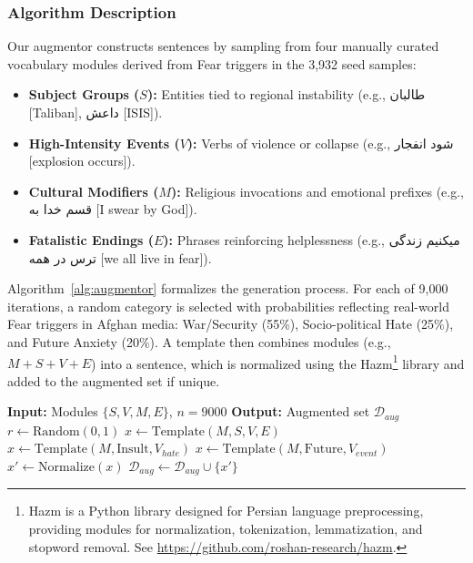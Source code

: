 \documentclass[runningheads]{llncs}
\newcommand{\textfarsi}[1]{{\foreignlanguage{arabic}{#1}}\xspace}
\begin{document}
\subsubsection{Algorithm Description}
Our augmentor constructs sentences by sampling from four manually curated 
vocabulary modules derived from Fear triggers in the 3,932 seed samples:

\begin{itemize}
    \item \textbf{Subject Groups ($S$):} Entities tied to regional instability 
    (e.g., \textfarsi{طالبان} [Taliban], \textfarsi{داعش} [ISIS]).
    \item \textbf{High-Intensity Events ($V$):} Verbs of violence or collapse 
    (e.g., \textfarsi{شود انفجار} [explosion occurs]).
    \item \textbf{Cultural Modifiers ($M$):} Religious invocations and emotional 
    prefixes (e.g., \textfarsi{قسم خدا به } [I swear by God]).
    \item \textbf{Fatalistic Endings ($E$):} Phrases reinforcing helplessness \newline
    (e.g., \textfarsi{میکنیم زندگی ترس در همه} [we all live in fear]).
\end{itemize}

Algorithm~\ref{alg:augmentor} formalizes the generation process. For each of 
9,000 iterations, a random category is selected with probabilities reflecting 
real-world Fear triggers in Afghan media: War/Security (55\%), Socio-political 
Hate (25\%), and Future Anxiety (20\%). A template then combines modules 
(e.g., $M + S + V + E$) into a sentence, which is normalized using the Hazm\footnote{Hazm is a Python library designed for Persian language preprocessing, providing modules for normalization, tokenization, lemmatization, and stopword removal. See \url{https://github.com/roshan-research/hazm}.}
library and added to the augmented set if unique.

\begin{algorithm}[H]
\caption{Afghan Fear Augmentor}
\label{alg:augmentor}
\begin{algorithmic}[1]
\STATE \textbf{Input:} Modules $\{S, V, M, E\}$, $n=9000$
\STATE \textbf{Output:} Augmented set $\mathcal{D}_{aug}$
    \STATE $r \leftarrow \text{Random}(0,1)$
        \STATE $x \leftarrow \text{Template}(M, S, V, E)$ 
        \STATE $x \leftarrow \text{Template}(M, \text{Insult}, V_{hate})$ 
    \ELSE
        \STATE $x \leftarrow \text{Template}(M, \text{Future}, V_{event})$ 
    \ENDIF
    \STATE $x' \leftarrow \text{Normalize}(x)$
        \STATE $\mathcal{D}_{aug} \leftarrow \mathcal{D}_{aug} \cup \{x'\}$
    \ENDIF
\ENDWHILE
\end{algorithmic}
\end{algorithm}
\end{document}
